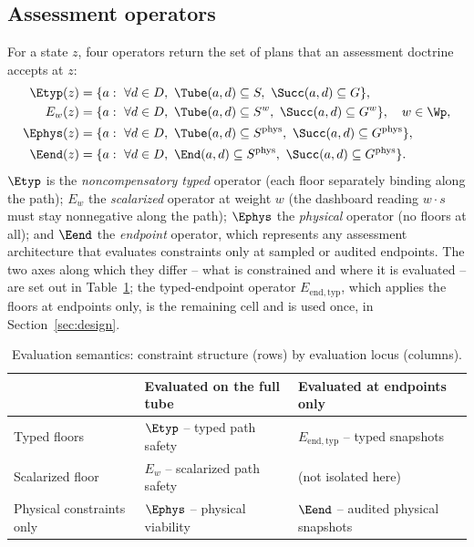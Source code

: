 \subsection{Assessment operators}

For a state $z$, four operators return the set of plans that an assessment doctrine accepts at $z$:
\begin{align}
\Etyp(z)&=\{a:\ \forall d\in D,\ \Tube(a,d)\subseteq S,\ \Succ(a,d)\subseteq G\}, \label{eq:Etyp}\\
E_w(z)&=\{a:\ \forall d\in D,\ \Tube(a,d)\subseteq S^w,\ \Succ(a,d)\subseteq G^w\},\quad w\in\Wp, \label{eq:Ew}\\
\Ephys(z)&=\{a:\ \forall d\in D,\ \Tube(a,d)\subseteq S^{\mathrm{phys}},\ \Succ(a,d)\subseteq G^{\mathrm{phys}}\}, \label{eq:Ephys}\\
\Eend(z)&=\{a:\ \forall d\in D,\ \End(a,d)\subseteq S^{\mathrm{phys}},\ \Succ(a,d)\subseteq G^{\mathrm{phys}}\}. \label{eq:Eend}
\end{align}
$\Etyp$ is the \emph{noncompensatory typed} operator (each floor separately binding along the path); $E_w$ the \emph{scalarized} operator at weight $w$ (the dashboard reading $w\cdot s$ must stay nonnegative along the path); $\Ephys$ the \emph{physical} operator (no floors at all); and $\Eend$ the \emph{endpoint} operator, which represents any assessment architecture that evaluates constraints only at sampled or audited endpoints. The two axes along which they differ -- what is constrained and where it is evaluated -- are set out in Table~\ref{tab:semantics}; the typed-endpoint operator $E_{\mathrm{end,typ}}$, which applies the floors at endpoints only, is the remaining cell and is used once, in Section~\ref{sec:design}.

\begin{table}[!htbp]
\centering\small
\caption{Evaluation semantics: constraint structure (rows) by evaluation locus (columns).}
\label{tab:semantics}
\begin{tabularx}{\textwidth}{@{}>{\raggedright\arraybackslash}p{}XX@{}}
\toprule
 & Evaluated on the full tube & Evaluated at endpoints only \\
\midrule
Typed floors & $\Etyp$ -- typed path safety & $E_{\mathrm{end,typ}}$ -- typed snapshots \\
Scalarized floor & $E_w$ -- scalarized path safety & (not isolated here) \\
Physical constraints only & $\Ephys$ -- physical viability & $\Eend$ -- audited physical snapshots \\
\bottomrule
\end{tabularx}
\end{table}

